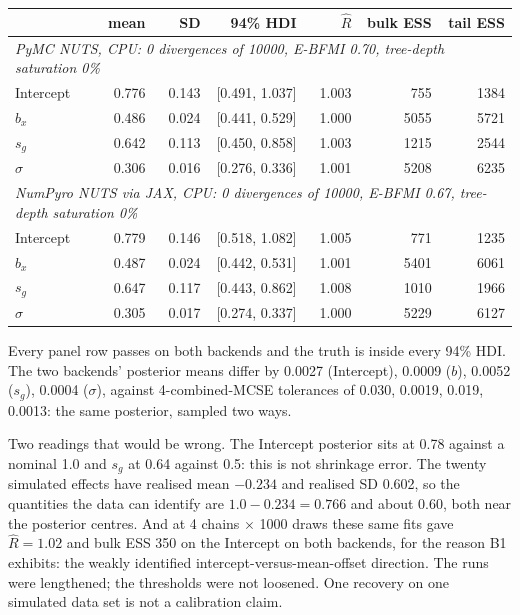 \documentclass[11pt]{article}
\begin{document}
\begin{center}\footnotesize
\begin{tabular}{lrrrrrr}
\toprule
 & mean & SD & 94\% HDI & $\hat R$ & bulk ESS & tail ESS \\
\midrule
\multicolumn{7}{l}{\emph{PyMC NUTS, CPU: 0 divergences of 10000, E-BFMI 0.70, tree-depth saturation 0\%}} \\
Intercept & 0.776 & 0.143 & [0.491, 1.037] & 1.003 & 755 & 1384 \\
$b_x$ & 0.486 & 0.024 & [0.441, 0.529] & 1.000 & 5055 & 5721 \\
$s_g$ & 0.642 & 0.113 & [0.450, 0.858] & 1.003 & 1215 & 2544 \\
$\sigma$ & 0.306 & 0.016 & [0.276, 0.336] & 1.001 & 5208 & 6235 \\
\midrule
\multicolumn{7}{l}{\emph{NumPyro NUTS via JAX, CPU: 0 divergences of 10000, E-BFMI 0.67, tree-depth saturation 0\%}} \\
Intercept & 0.779 & 0.146 & [0.518, 1.082] & 1.005 & 771 & 1235 \\
$b_x$ & 0.487 & 0.024 & [0.442, 0.531] & 1.001 & 5401 & 6061 \\
$s_g$ & 0.647 & 0.117 & [0.443, 0.862] & 1.008 & 1010 & 1966 \\
$\sigma$ & 0.305 & 0.017 & [0.274, 0.337] & 1.000 & 5229 & 6127 \\
\bottomrule
\end{tabular}
\end{center}

Every panel row passes on both backends and the truth is inside every 94\% HDI. The two
backends' posterior means differ by 0.0027 (Intercept), 0.0009 ($b$), 0.0052 ($s_g$),
0.0004 ($\sigma$), against 4-combined-MCSE tolerances of 0.030, 0.0019, 0.019, 0.0013:
the same posterior, sampled two ways.

Two readings that would be wrong. The Intercept posterior sits at 0.78 against a nominal
1.0 and $s_g$ at 0.64 against 0.5: this is not shrinkage error. The twenty simulated
effects have realised mean $-0.234$ and realised SD 0.602, so the quantities the data can
identify are $1.0 - 0.234 = 0.766$ and about 0.60, both near the posterior centres. And at
4 chains $\times$ 1000 draws these same fits gave $\hat R = 1.02$ and bulk ESS 350 on the
Intercept on both backends, for the reason B1 exhibits: the weakly identified
intercept-versus-mean-offset direction. The runs were lengthened; the thresholds were not
loosened. One recovery on one simulated data set is not a calibration claim.
\end{document}
